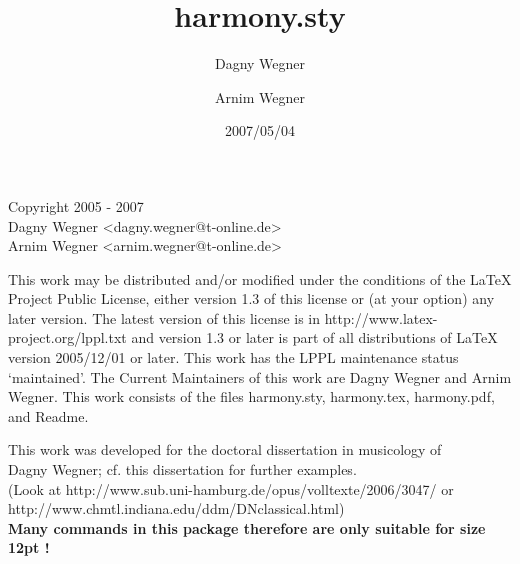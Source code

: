 \documentclass[12pt,origlongtable,pdftex]{scrartcl}
\begin{document}
%
\title{harmony.sty}
\author{Dagny Wegner \and Arnim Wegner}
\date{2007/05/04}
\maketitle
%
\vfill
%
\begin{center}
Copyright 2005 - 2007\\ 
Dagny Wegner <dagny.wegner@t-online.de>\\
Arnim Wegner <arnim.wegner@t-online.de>
\end{center}
This work may be distributed and/or modified under the
conditions of the LaTeX Project Public License, either
version 1.3 of this license or (at your option) any
later version.
The latest version of this license is in
http://www.latex-project.org/lppl.txt
and version 1.3 or later is part of all distributions
of LaTeX version 2005/12/01 or later.
This work has the LPPL maintenance status `maintained'.
The Current Maintainers of this work are
Dagny Wegner and Arnim Wegner.
This work consists of the files harmony.sty,
harmony.tex, harmony.pdf, and Readme.
%
\newpage
%
\begin{center}
This work was developed for the doctoral dissertation in musicology of\\
Dagny Wegner; cf. this dissertation for further examples.\\
(Look at http://www.sub.uni-hamburg.de/opus/volltexte/2006/3047/ or
http://www.chmtl.indiana.edu/ddm/DNclassical.html)\\[2ex]
\textbf{Many commands in this package therefore are only suitable for size 12pt !}
\end{center}
%
\vspace{2ex}
%
\end{document}
